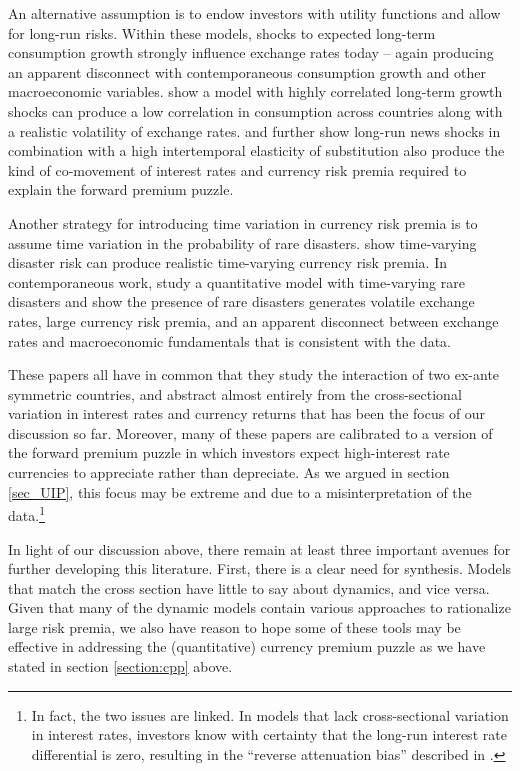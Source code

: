\documentclass{ar-1col}
\begin{document}
An alternative assumption is to endow investors with \cite{EpsteinZin1989} utility functions and allow for long-run risks. Within these models, shocks to expected long-term consumption growth strongly influence exchange rates today -- again producing an apparent disconnect with contemporaneous consumption growth and other macroeconomic variables. \citet{ColacitoCroce2011} show a model with highly correlated long-term growth shocks can produce a low correlation in consumption across countries along with a realistic volatility of exchange rates. \citet{BansalShaliastovich2012} and \citet{ColacitoCroce2013} further show long-run news shocks in combination with a high intertemporal elasticity of substitution also produce the kind of co-movement of interest rates and currency risk premia required to explain the forward premium puzzle. 

Another strategy for introducing time variation in currency risk premia is to assume time variation in the probability of rare disasters. \citet{FarhiGabaix2016} show time-varying disaster risk can produce realistic time-varying currency risk premia. In contemporaneous work, \citet{GourioSiemerVerdelhan2011} study a quantitative model with time-varying rare disasters and show the presence of rare disasters generates volatile exchange rates, large currency risk premia, and an apparent disconnect between exchange rates and macroeconomic fundamentals that is consistent with the data.

These papers all have in common that they study the interaction of two ex-ante symmetric countries, and abstract almost entirely from the cross-sectional variation in interest rates and currency returns that has been the focus of our discussion so far. Moreover, many of these papers are calibrated to a version of the forward premium puzzle in which investors expect high-interest rate currencies to appreciate rather than depreciate. As we argued in section \ref{sec_UIP}, this focus may be extreme and due to a misinterpretation of the data.\footnote{In fact, the two issues are linked. In models that lack cross-sectional variation in interest rates, investors know with certainty that the long-run interest rate differential is zero, resulting in the ``reverse attenuation bias'' described in \cite{HassanMano2019}.} 

In light of our discussion above, there remain at least three important avenues for further developing this literature. First, there is a clear need for synthesis. Models that match the cross section have little to say about dynamics, and vice versa. Given that many of the dynamic models contain various approaches to rationalize large risk premia, we also have reason to hope some of these tools may be effective in addressing the (quantitative) currency premium puzzle as we have stated in section \ref{section:cpp} above. 
\end{document}

